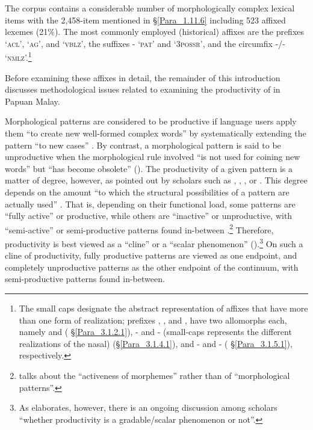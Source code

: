 The corpus contains a considerable number of morphologically complex lexical items with the 2,458-item  mentioned in §\ref{Para_1.11.6} including 523 affixed lexemes (21\%). The most commonly employed (historical) affixes are the prefixes  ‘\textsc{acl}’,  ‘\textsc{ag}’, and  ‘\textsc{vblz}’, the suffixes - ‘\textsc{pat}’ and  ‘\textsc{3possr}’, and the circumfix -/- ‘\textsc{nmlz}’.\footnote{The small caps designate the abstract representation of affixes that have more than one form of realization; prefixes , , and , have two allomorphs each, namely \textitbf{-} and \textitbf{-} ( §\ref{Para_3.1.2.1}), \textitbf{)}- and \textitbf{)}- (small-caps  represents the different realizations of the nasal) (§\ref{Para_3.1.4.1}), and - and - ( §\ref{Para_3.1.5.1}), respectively.}



Before examining these affixes in detail, the remainder of this introduction discusses methodological issues related to examining the productivity of  in Papuan Malay.



Morphological patterns are considered to be productive if language users apply them “to create new well-formed complex words” by systematically extending the pattern “to new cases” \citep[67, 68]{Booij.2007}. By contrast, a morphological pattern is said to be unproductive when the morphological rule involved “is not used for coining new words” but “has become obsolete” (\citeyear*[68]{Booij.2007}). The productivity of a given pattern is a matter of degree, however, as pointed out by scholars such as \citet[49–58]{Aikhenvald.2007}, \citet[62–100]{Bauer.1983}, \citet[67–71]{Booij.2007}, or \citet[169–172]{Pike.1967}. This degree depends on the amount “to which the structural possibilities of a  pattern are actually used” \citep[68]{Booij.2007}. That is, depending on their functional load, some patterns are “fully active” or productive, while others are “inactive” or unproductive, with “semi-active” or semi-productive patterns found in-between \citep[169–171]{Pike.1967}.\footnote{\citet[169–171]{Pike.1967} talks about the “activeness of morphemes” rather than of “morphological patterns”.} Therefore, productivity is best viewed as a “cline” \citep[97]{Bauer.1983} or a “scalar phenomenon” (\citeyear*[126]{Bauer.2001}).\footnote{As {\citet[125]{Bauer.2001}} elaborates, however, there is an ongoing discussion among scholars “whether productivity is a gradable/scalar phenomenon or not”.} On such a cline of productivity, fully productive patterns are viewed as one endpoint, and completely unproductive patterns as the other endpoint of the continuum, with semi-productive patterns found in-between.



